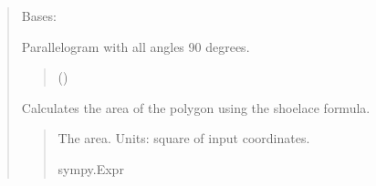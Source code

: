\documentclass[letterpaper,10pt,english]{sphinxmanual}
\begin{document}
\begin{quote}
\begin{fulllineitems}
\label{\detokenize{pygeox:pygeox.custom_objects.Rectangle}}
\pysigstartsignatures
\pysiglinewithargsret
{}
{\sphinxparamcomma {}\sphinxparamcomma {}\sphinxparamcomma {}\sphinxparamcomma {}\sphinxparamcomma {}\sphinxparamcomma {}\sphinxparamcomma {}}
{}
\pysigstopsignatures
\sphinxAtStartPar
Bases: 

\sphinxAtStartPar
Parallelogram with all angles 90 degrees.
\begin{quote}\begin{description}
\sphinxAtStartPar
{} ()

\end{description}\end{quote}

\begin{fulllineitems}
\label{\detokenize{pygeox:pygeox.custom_objects.Rectangle.area}}
\pysigstartsignatures
\pysigline
{}
\pysigstopsignatures
\sphinxAtStartPar
Calculates the area of the polygon using the shoelace formula.
\begin{quote}\begin{description}
\sphinxAtStartPar
The area. Units: square of input coordinates.

\sphinxAtStartPar
sympy.Expr

\end{description}\end{quote}

\end{fulllineitems}


\end{fulllineitems}
\end{quote}
\end{document}

